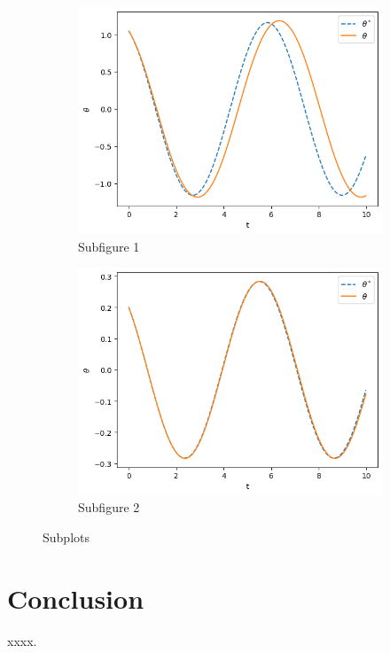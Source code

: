 \documentclass{article}
\begin{document}
\begin{figure}[htbp]
    \centering
    \begin{subfigure}[b]{0.47\textwidth}
        \centering
        \includegraphics[width=\textwidth]{demo2-1.png}
        \caption{Subfigure 1}
        \label{fig:demo2-a}
    \end{subfigure}
    \begin{subfigure}[b]{0.47\textwidth}
        \centering
        \includegraphics[width=\textwidth]{demo2-2.png}
        \caption{Subfigure 2}
        \label{fig:demo2-b}
    \end{subfigure}
    \caption{Subplots}
    \label{fig:demo2}
\end{figure}

\section{Conclusion}

xxxx.
\end{document}
